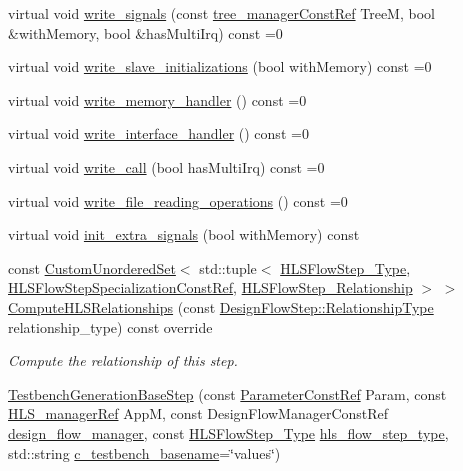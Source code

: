 \begin{DoxyCompactItemize}
virtual void \hyperlink{classTestbenchGenerationBaseStep_af4bf6836e809359aa23a892ea16c08df}{write\+\_\+signals} (const \hyperlink{tree__manager_8hpp_a792e3f1f892d7d997a8d8a4a12e39346}{tree\+\_\+manager\+Const\+Ref} TreeM, bool \&with\+Memory, bool \&has\+Multi\+Irq) const =0
\item 
virtual void \hyperlink{classTestbenchGenerationBaseStep_ae67ccd4b5e09cbd14bd2218330161d3e}{write\+\_\+slave\+\_\+initializations} (bool with\+Memory) const =0
\item 
virtual void \hyperlink{classTestbenchGenerationBaseStep_a5c3f6e20a10e10fd2abded2de983d6ad}{write\+\_\+memory\+\_\+handler} () const =0
\item 
virtual void \hyperlink{classTestbenchGenerationBaseStep_a7568b1b1e16628fecd673da73e8ed71b}{write\+\_\+interface\+\_\+handler} () const =0
\item 
virtual void \hyperlink{classTestbenchGenerationBaseStep_a07a88446a9b569d6776e8d20ea323809}{write\+\_\+call} (bool has\+Multi\+Irq) const =0
\item 
virtual void \hyperlink{classTestbenchGenerationBaseStep_abebc101901191b2ee6732df8c9ecc9ee}{write\+\_\+file\+\_\+reading\+\_\+operations} () const =0
\item 
virtual void \hyperlink{classTestbenchGenerationBaseStep_a8f0da7801c3e9c8050240d9567d70bc9}{init\+\_\+extra\+\_\+signals} (bool with\+Memory) const
\item 
const \hyperlink{classCustomUnorderedSet}{Custom\+Unordered\+Set}$<$ std\+::tuple$<$ \hyperlink{hls__step_8hpp_ada16bc22905016180e26fc7e39537f8d}{H\+L\+S\+Flow\+Step\+\_\+\+Type}, \hyperlink{hls__step_8hpp_a5fdd2edf290c196531d21d68e13f0e74}{H\+L\+S\+Flow\+Step\+Specialization\+Const\+Ref}, \hyperlink{hls__step_8hpp_a3ad360b9b11e6bf0683d5562a0ceb169}{H\+L\+S\+Flow\+Step\+\_\+\+Relationship} $>$ $>$ \hyperlink{classTestbenchGenerationBaseStep_a2eb22c9083dd50cf754d3775697e0de0}{Compute\+H\+L\+S\+Relationships} (const \hyperlink{classDesignFlowStep_a723a3baf19ff2ceb77bc13e099d0b1b7}{Design\+Flow\+Step\+::\+Relationship\+Type} relationship\+\_\+type) const override
\begin{DoxyCompactList}\small\item\em Compute the relationship of this step. \end{DoxyCompactList}\item 
\hyperlink{classTestbenchGenerationBaseStep_ab6735269f9e989952695c74d9d982ff6}{Testbench\+Generation\+Base\+Step} (const \hyperlink{Parameter_8hpp_a37841774a6fcb479b597fdf8955eb4ea}{Parameter\+Const\+Ref} Param, const \hyperlink{hls__manager_8hpp_acd3842b8589fe52c08fc0b2fcc813bfe}{H\+L\+S\+\_\+manager\+Ref} AppM, const Design\+Flow\+Manager\+Const\+Ref \hyperlink{classDesignFlowStep_ab770677ddf087613add30024e16a5554}{design\+\_\+flow\+\_\+manager}, const \hyperlink{hls__step_8hpp_ada16bc22905016180e26fc7e39537f8d}{H\+L\+S\+Flow\+Step\+\_\+\+Type} \hyperlink{classHLS__step_aefd59af15346ec3f10bf12bd756e6777}{hls\+\_\+flow\+\_\+step\+\_\+type}, std\+::string \hyperlink{classTestbenchGenerationBaseStep_af264e2da91d4dd727725ea5d6b3136c1}{c\+\_\+testbench\+\_\+basename}=\char`\"{}values\char`\"{})

\end{DoxyCompactItemize}
